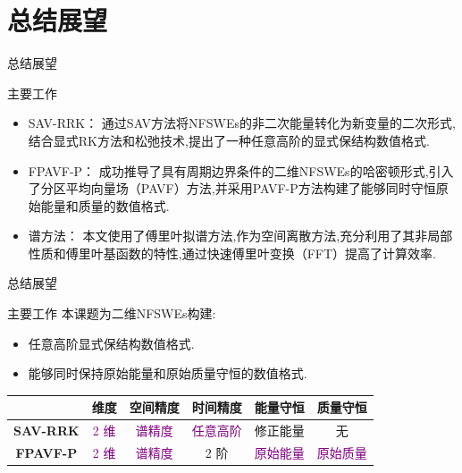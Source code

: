 \documentclass[aspectratio=169]{beamer}
\numberwithin{theorem}{section} %
\begin{document}
\section{总结展望}
\begin{frame}{总结展望}
	\begin{block}{主要工作}
			\begin{itemize}
				\item \textcolor[rgb]{0.227,0.373,0.306}{SAV-RRK：} 通过SAV方法将NFSWEs的非二次能量转化为新变量的二次形式,结合显式RK方法和松弛技术,提出了一种任意高阶的显式保结构数值格式.
				\item \textcolor[rgb]{0.227,0.373,0.306}{FPAVF-P：} 成功推导了具有周期边界条件的二维NFSWEs的\textcolor[rgb]{0.227,0.373,0.306}{哈密顿形式},引入了分区平均向量场（PAVF）方法,并采用PAVF-P方法构建了能够同时守恒原始能量和质量的数值格式.
				\item \textcolor[rgb]{0.227,0.373,0.306}{谱方法：} 本文使用了傅里叶拟谱方法,作为空间离散方法,充分利用了其非局部性质和傅里叶基函数的特性,通过快速傅里叶变换（FFT）提高了计算效率.
			\end{itemize}
		\end{block}
		
\end{frame}

\begin{frame}{总结展望}
	\begin{block}{主要工作}
	本课题为二维NFSWEs构建:
	\begin{itemize}
		\item 任意高阶显式保结构数值格式.
		\item 能够同时保持原始能量和原始质量守恒的数值格式.
	\end{itemize}
\begin{table}[htbp]
	\centering
	  \begin{tabular}{cccccc}
	  \toprule
	  \textcolor[rgb]{0.227,0.373,0.306}{} & \textcolor[rgb]{0.227,0.373,0.306}{\textbf{维度}} & \textcolor[rgb]{0.227,0.373,0.306}{\textbf{空间精度}} & \textcolor[rgb]{0.227,0.373,0.306}{\textbf{时间精度}} & \textcolor[rgb]{0.227,0.373,0.306}{\textbf{能量守恒}} & \textcolor[rgb]{0.227,0.373,0.306}{\textbf{质量守恒}} \\
	  \midrule
	  \textcolor[rgb]{0.227,0.373,0.306}{\textbf{SAV-RRK}} & \textcolor{purple}{2 维}   & \textcolor{purple}{谱精度}   & \textcolor{purple}{任意高阶}  & 修正能量  & 无 \\
	  \midrule
	  \textcolor[rgb]{0.227,0.373,0.306}{\textbf{FPAVF-P}} & \textcolor{purple}{2 维}   & \textcolor{purple}{谱精度}   & 2 阶   & \textcolor{purple}{原始能量}  & \textcolor{purple}{原始质量} \\
	  \bottomrule
	  \end{tabular}%
	\label{tab:3}%
  \end{table}%
\end{block}
\end{frame}
\end{document}
